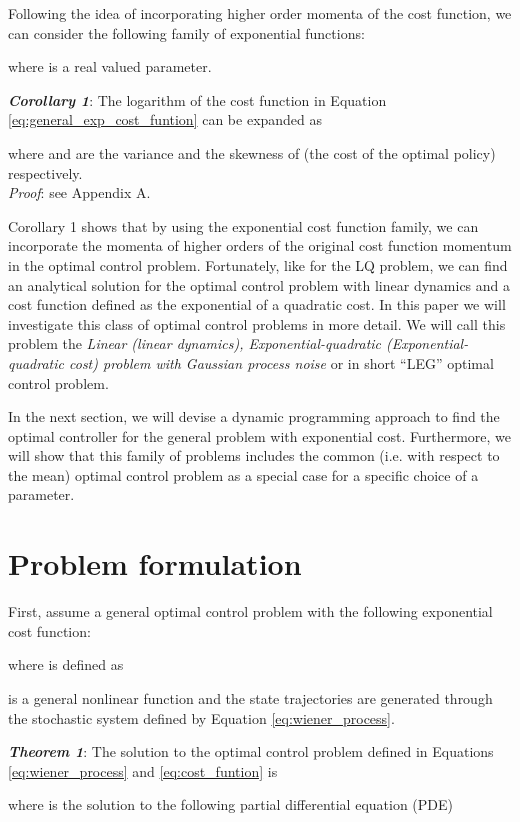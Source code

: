 \documentclass[letterpaper, 10 pt, conference]{ieeeconf}
\begin{document}
Following the idea of incorporating higher order momenta of the cost
function, we can consider the following family of exponential
functions:
 
where  is a real valued parameter. 

\textbf{\textit{Corollary 1}}: The logarithm of the cost function in Equation \eqref{eq:general_exp_cost_funtion} can be expanded as

where  and  are the variance and the skewness of  (the cost of the optimal policy) respectively. \\
\textit{Proof}: see Appendix A.

Corollary 1 shows that by using the exponential cost function family, we can
incorporate the momenta of higher orders of the original cost function
momentum in the optimal control problem. Fortunately, like for the LQ problem, we can find an
analytical solution for the optimal control problem with linear dynamics and a
cost function defined as the exponential of a quadratic cost. In this paper we
will investigate this class of optimal control problems in more detail. We will
call this problem the \emph{Linear (linear dynamics), Exponential-quadratic
(Exponential-quadratic cost) problem with Gaussian process noise} or in short
``LEG'' optimal control problem.

In the next section, we will devise a dynamic programming approach to find the
optimal controller for the general problem with exponential cost. Furthermore, we
will show that this family of problems includes the common (i.e. with respect to
the mean) optimal control problem as a special case for a specific choice of a
parameter.

\section{Problem formulation}
First, assume a general optimal control problem with the following exponential
cost function:

where  is defined as

 is a general nonlinear function and the state trajectories are
generated through the stochastic system defined by Equation \eqref{eq:wiener_process}.

\textbf{\textit{Theorem 1}}: The solution to the optimal control problem defined
in Equations \eqref{eq:wiener_process} and \eqref{eq:cost_funtion} is

where  is the solution to the following partial differential equation (PDE)
\end{document}
